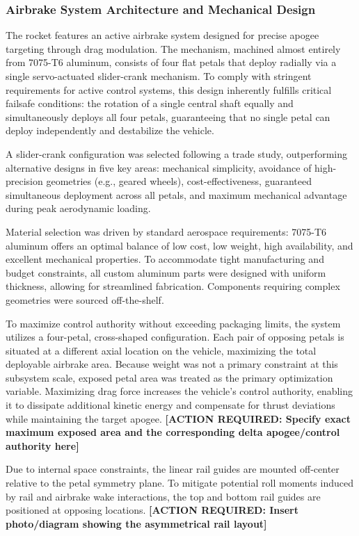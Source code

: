 \documentclass[11pt, a4paper]{article} %
\begin{document}
\subsubsection{Airbrake System Architecture and Mechanical Design}

The rocket features an active airbrake system designed for precise apogee targeting through drag modulation. The mechanism, machined almost entirely from 7075-T6 aluminum, consists of four flat petals that deploy radially via a single servo-actuated slider-crank mechanism. To comply with stringent requirements for active control systems, this design inherently fulfills critical failsafe conditions: the rotation of a single central shaft equally and simultaneously deploys all four petals, guaranteeing that no single petal can deploy independently and destabilize the vehicle.

A slider-crank configuration was selected following a trade study, outperforming alternative designs in five key areas: mechanical simplicity, avoidance of high-precision geometries (e.g., geared wheels), cost-effectiveness, guaranteed simultaneous deployment across all petals, and maximum mechanical advantage during peak aerodynamic loading.

Material selection was driven by standard aerospace requirements: 7075-T6 aluminum offers an optimal balance of low cost, low weight, high availability, and excellent mechanical properties. To accommodate tight manufacturing and budget constraints, all custom aluminum parts were designed with uniform thickness, allowing for streamlined fabrication. Components requiring complex geometries were sourced off-the-shelf.

To maximize control authority without exceeding packaging limits, the system utilizes a four-petal, cross-shaped configuration. Each pair of opposing petals is situated at a different axial location on the vehicle, maximizing the total deployable airbrake area. Because weight was not a primary constraint at this subsystem scale, exposed petal area was treated as the primary optimization variable. Maximizing drag force increases the vehicle's control authority, enabling it to dissipate additional kinetic energy and compensate for thrust deviations while maintaining the target apogee. \textbf{[ACTION REQUIRED: Specify exact maximum exposed area and the corresponding delta apogee/control authority here]}

Due to internal space constraints, the linear rail guides are mounted off-center relative to the petal symmetry plane. To mitigate potential roll moments induced by rail and airbrake wake interactions, the top and bottom rail guides are positioned at opposing locations. \textbf{[ACTION REQUIRED: Insert photo/diagram showing the asymmetrical rail layout]}
\end{document}
